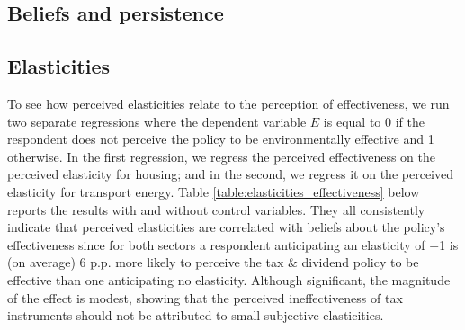 \documentclass[12pt]{article} %
\begin{document}
\begin{appendices}
\section{Beliefs and persistence\label{sec:app_perception}}

\subsection{Elasticities}



To see how perceived elasticities relate to the perception of effectiveness, we run two separate regressions where the dependent variable $E$ is equal to 0 if the respondent does not perceive the policy to be environmentally effective and 1 otherwise. In the first regression, we regress the perceived effectiveness on the perceived elasticity for housing; and in the second, we regress it on the perceived elasticity for transport energy. Table \ref{table:elasticities_effectiveness} below reports the results with and without control variables. They all consistently indicate that perceived elasticities are correlated with beliefs about the policy's effectiveness since for both sectors a respondent anticipating an elasticity of $-$1 is (on average) 6 p.p. more likely to perceive the tax \& dividend policy to be effective than one anticipating no elasticity. Although significant, the magnitude of the effect is modest, showing that the perceived ineffectiveness of tax instruments should not be attributed to small subjective elasticities.


\end{appendices}
\end{document}
